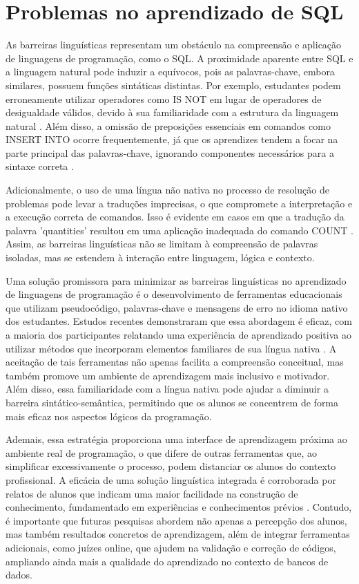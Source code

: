 \section{Problemas no aprendizado de SQL}

As barreiras linguísticas representam um obstáculo na compreensão e aplicação de linguagens de programação, como o SQL. A proximidade aparente entre SQL e a linguagem natural pode induzir a equívocos, pois as palavras-chave, embora similares, possuem funções sintáticas distintas. Por exemplo, estudantes podem erroneamente utilizar operadores como IS NOT em lugar de operadores de desigualdade válidos, devido à sua familiaridade com a estrutura da linguagem natural \cite{Miedema2021}. Além disso, a omissão de preposições essenciais em comandos como INSERT INTO ocorre frequentemente, já que os aprendizes tendem a focar na parte principal das palavras-chave, ignorando componentes necessários para a sintaxe correta \cite{Miedema2021}.

Adicionalmente, o uso de uma língua não nativa no processo de resolução de problemas pode levar a traduções imprecisas, o que compromete a interpretação e a execução correta de comandos. Isso é evidente em casos em que a tradução da palavra 'quantities' resultou em uma aplicação inadequada do comando COUNT \cite{Miedema2021}. Assim, as barreiras linguísticas não se limitam à compreensão de palavras isoladas, mas se estendem à interação entre linguagem, lógica e contexto.

Uma solução promissora para minimizar as barreiras linguísticas no aprendizado de linguagens de programação é o desenvolvimento de ferramentas educacionais que utilizam pseudocódigo, palavras-chave e mensagens de erro no idioma nativo dos estudantes. Estudos recentes demonstraram que essa abordagem é eficaz, com a maioria dos participantes relatando uma experiência de aprendizado positiva ao utilizar métodos que incorporam elementos familiares de sua língua nativa \cite{Silva2020}. A aceitação de tais ferramentas não apenas facilita a compreensão conceitual, mas também promove um ambiente de aprendizagem mais inclusivo e motivador. Além disso, essa familiaridade com a língua nativa pode ajudar a diminuir a barreira sintático-semântica, permitindo que os alunos se concentrem de forma mais eficaz nos aspectos lógicos da programação.

Ademais, essa estratégia proporciona uma interface de aprendizagem próxima ao ambiente real de programação, o que difere de outras ferramentas que, ao simplificar excessivamente o processo, podem distanciar os alunos do contexto profissional. A eficácia de uma solução linguística integrada é corroborada por relatos de alunos que indicam uma maior facilidade na construção de conhecimento, fundamentado em experiências e conhecimentos prévios \cite{Silva2020}. Contudo, é importante que futuras pesquisas abordem não apenas a percepção dos alunos, mas também resultados concretos de aprendizagem, além de integrar ferramentas adicionais, como juízes online, que ajudem na validação e correção de códigos, ampliando ainda mais a qualidade do aprendizado no contexto de bancos de dados.

